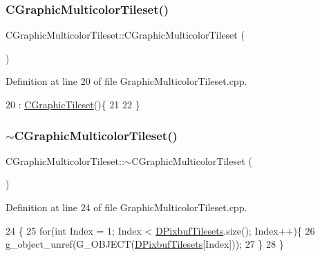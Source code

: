 \subsubsection{\texorpdfstring{C\+Graphic\+Multicolor\+Tileset()}{CGraphicMulticolorTileset()}}
{\footnotesize\ttfamily C\+Graphic\+Multicolor\+Tileset\+::\+C\+Graphic\+Multicolor\+Tileset (\begin{DoxyParamCaption}{ }\end{DoxyParamCaption})}



Definition at line 20 of file Graphic\+Multicolor\+Tileset.\+cpp.


\begin{DoxyCode}
20                                                      : \hyperlink{classCGraphicTileset_a871889683273be71a94c73776fcd507b}{CGraphicTileset}()\{
21     
22 \}
\end{DoxyCode}
\hypertarget{classCGraphicMulticolorTileset_aa454897de796ad7048f6bb64fdd5311e}{}\label{classCGraphicMulticolorTileset_aa454897de796ad7048f6bb64fdd5311e} 
\subsubsection{\texorpdfstring{$\sim$\+C\+Graphic\+Multicolor\+Tileset()}{~CGraphicMulticolorTileset()}}
{\footnotesize\ttfamily C\+Graphic\+Multicolor\+Tileset\+::$\sim$\+C\+Graphic\+Multicolor\+Tileset (\begin{DoxyParamCaption}{ }\end{DoxyParamCaption})\hspace{0.3cm}{\ttfamily [virtual]}}



Definition at line 24 of file Graphic\+Multicolor\+Tileset.\+cpp.


\begin{DoxyCode}
24                                                      \{
25     \textcolor{keywordflow}{for}(\textcolor{keywordtype}{int} Index = 1; Index < \hyperlink{classCGraphicMulticolorTileset_a30809d113b0f314944425a3c8f21408c}{DPixbufTilesets}.size(); Index++)\{
26         g\_object\_unref(G\_OBJECT(\hyperlink{classCGraphicMulticolorTileset_a30809d113b0f314944425a3c8f21408c}{DPixbufTilesets}[Index]));   
27     \}
28 \}
\end{DoxyCode}


